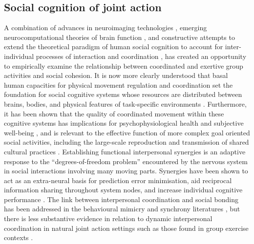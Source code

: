 \subsection{Social cognition of joint action}
A combination of advances in neuroimaging technologies \citep{Frith2007}, emerging neurocomputational theories of brain function \citep{Friston2010,Frith2010,Clark2013}, and constructive attempts to extend the theoretical paradigm of human social cognition to account for inter-individual processes of interaction and coordination \citep{Sebanz2006,Dale2014}, has created an opportunity to empirically examine the relationship between coordinated and exertive group activities and social cohesion.  It is now more clearly understood that basal human capacities for physical movement regulation and coordination set the foundation for social cognitive systems whose resources are distributed between brains, bodies, and physical features of task-specific environments \citep{Hutchins2000,Kirsh2006,Semin2008,Semin2012,Coey2012}.  Furthermore, it has been shown that the quality of coordinated movement within these cognitive systems has implications for psychophysiological health and subjective well-being \citep{Wheatley2012}, and is relevant to the effective function of more complex goal oriented social activities, including the large-scale reproduction and transmission of shared cultural practices \citep{Dunbar2012,Roepstorff2010,Claidiere2014,Launay2016}.
Establishing functional interpersonal synergies is an adaptive response to the ``degrees-of-freedom problem'' encountered by the nervous system in social interactions involving many moving parts.  Synergies have been shown to act as an extra-neural basis for prediction error minimisation, aid reciprocal information sharing throughout system nodes, and increase individual cognitive performance \citep{Schmidt2016}.  The link between interpersonal coordination and social bonding has been addressed in the behavioural mimicry and synchrony literatures \citep[e.g.,][]{Wheatley2012,Launay2016,Mogan2017}, but there is less substantive evidence in relation to dynamic interpersonal coordination in natural joint action settings such as those found in group exercise contexts \citep{Marsh2009,Miles2009,Lumsden2012}.

